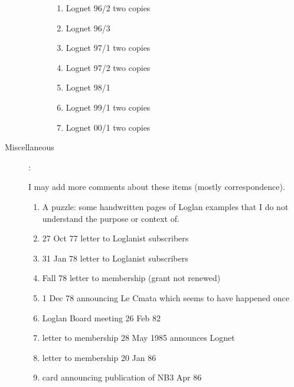 \documentclass[12pt]{article}
\begin{document}
\begin{description}
\begin{description}
\begin{enumerate}
\item Lognet 96/2 two copies

\item Lognet 96/3

\item Lognet 97/1 two copies

\item Lognet 97/2 two copies

\item Lognet 98/1

\item Lognet 99/1 two copies

\item Lognet 00/1 two copies












\end{enumerate}


\end{description}

\item[Miscellaneous]:

I may add more comments about these items (mostly correspondence).

\begin{enumerate}

\item  A puzzle:  some handwritten pages of Loglan examples that I do not understand the purpose or context of.

\item 27 Oct 77 letter to Loglanist subscribers

\item 31 Jan 78 letter to Loglanist subscribers

\item Fall 78 letter to membership (grant not renewed)

\item 1 Dec 78 announcing Le Cmata which seems to have happened once

\item Loglan Board meeting 26 Feb 82

\item letter to membership 28 May 1985 announces Lognet

\item letter to membership 20 Jan 86

\item card announcing publication of NB3 Apr 86


\end{enumerate}
\end{description}
\end{document}
